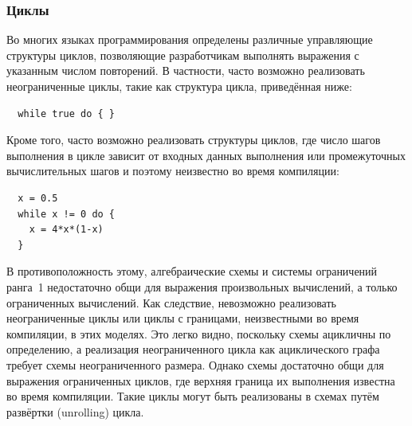 \subsubsection{Циклы} Во многих языках программирования определены различные управляющие структуры циклов, позволяющие разработчикам выполнять выражения с указанным числом повторений. В частности, часто возможно реализовать неограниченные циклы, такие как структура цикла, приведённая ниже:
\begin{lstlisting}
  while true do { }
\end{lstlisting}
Кроме того, часто возможно реализовать структуры циклов, где число шагов выполнения в цикле зависит от входных данных выполнения или промежуточных вычислительных шагов и поэтому неизвестно во время компиляции:
\begin{lstlisting}
  x = 0.5
  while x != 0 do { 
    x = 4*x*(1-x) 
  }
\end{lstlisting}

В противоположность этому, алгебраические схемы и системы ограничений ранга~1 недостаточно общи для выражения произвольных вычислений, а только ограниченных вычислений. Как следствие, невозможно реализовать неограниченные циклы или циклы с границами, неизвестными во время компиляции, в этих моделях. Это легко видно, поскольку схемы ацикличны по определению, а реализация неограниченного цикла как ациклического графа требует схемы неограниченного размера. Однако схемы достаточно общи для выражения ограниченных циклов, где верхняя граница их выполнения известна во время компиляции. Такие циклы могут быть реализованы в схемах путём развёртки (unrolling) цикла.

